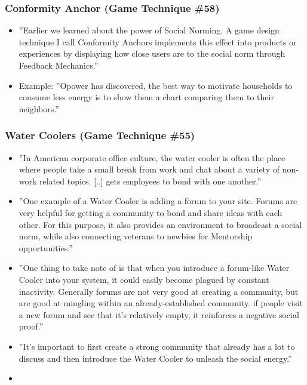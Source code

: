     \subsubsection{Conformity Anchor (Game Technique \#58)}
    \begin{itemize}
        \item ''Earlier we learned about the power of Social Norming. A game design technique I call Conformity Anchors implements this effect into products or experiences by displaying how close users are to the social norm through Feedback Mechanics.''
        \item Example: ''Opower has discovered, the best way to motivate households to consume less energy is to show them a chart comparing them to their neighbors.''
    \end{itemize}
    
\subsubsection{Water Coolers (Game Technique \#55)}
    \begin{itemize}
        \item ''In American corporate office culture, the water cooler is often the place where people take a small break from work and chat about a variety of non-work related topics. [..] gets employees to bond with one another.''
        \item ''One example of a Water Cooler is adding a forum to your site. Forums are very helpful for getting a community to bond and share ideas with each other. For this purpose, it also provides an environment to broadcast a social norm, while also connecting veterans to newbies for Mentorship opportunities.''
        \item ''One thing to take note of is that when you introduce a forum-like Water Cooler into your system, it could easily become plagued by constant inactivity. Generally forums are not very good at creating a community, but are good at mingling within an already-established community. if people visit a new forum and see that it's relatively empty, it reinforces a negative social proof.''
        \item ''It's important to first create a strong community that already has a lot to discuss and then introduce the Water Cooler to unleash the social energy.''
        \item
    \end{itemize}
    
